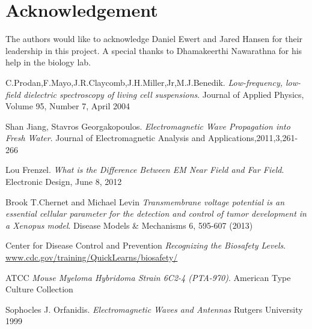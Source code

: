 \documentclass[journal]{IEEEtran}
\begin{document}
\section{Acknowledgement}
The authors would like to acknowledge Daniel Ewert and Jared Hansen for their leadership in this project. A special thanks to Dhamakeerthi Nawarathna for his help in the biology lab.

\begin{thebibliography}{9}

C.Prodan,F.Mayo,J.R.Claycomb,J.H.Miller,Jr,M.J.Benedik.
\textit{Low-frequency, low-field dielectric spectroscopy of living cell suspensions}.
Journal of Applied Physics, Volume 95, Number 7, April 2004

Shan Jiang, Stavros Georgakopoulos.
\textit{Electromagnetic Wave Propagation into Fresh Water}.
Journal of Electromagnetic Analysis and Applications,2011,3,261-266

Lou Frenzel.
\textit{What is the Difference Between EM Near Field and Far Field}.
Electronic Design, June 8, 2012

Brook T.Chernet and Michael Levin
\textit{Transmembrane voltage potential is an essential cellular parameter for the detection and control of tumor development in a Xenopus model}. Disease Models \& Mechanisms 6, 595-607 (2013)

Center for Disease Control and Prevention
\textit{Recognizing the Biosafety Levels}.
\url{www.cdc.gov/training/QuickLearns/biosafety/}

ATCC
\textit{Mouse Myeloma Hybridoma Strain 6C2-4 (PTA-970)}.
American Type Culture Collection

Sophocles J. Orfanidis.
\textit{Electromagnetic Waves and Antennas}
Rutgers University 1999
\end{thebibliography}
\end{document}
